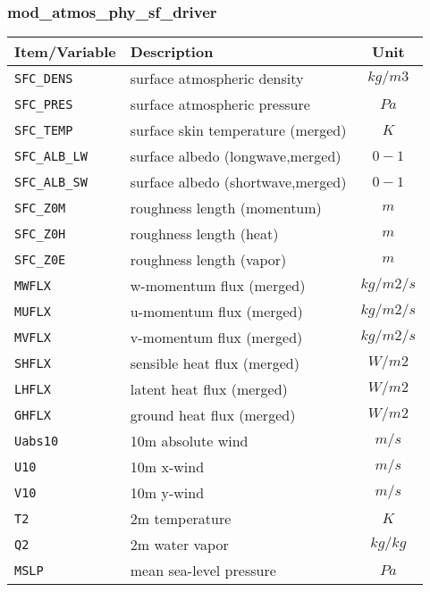 \subsubsection{mod\_atmos\_phy\_sf\_driver}
 \begin{tabularx}{150mm}{|l|X|c|} \hline
 \rowcolor[gray]{0.9} Item/Variable & Description  & Unit \\ \hline
  \verb|SFC_DENS| & surface atmospheric density & $kg/m3$ \\\hline
  \verb|SFC_PRES| & surface atmospheric pressure & $Pa$ \\\hline
  \verb|SFC_TEMP| & surface skin temperature (merged) & $K$ \\\hline
  \verb|SFC_ALB_LW| & surface albedo (longwave,merged) & $0-1$ \\\hline
  \verb|SFC_ALB_SW| & surface albedo (shortwave,merged) & $0-1$ \\\hline
  \verb|SFC_Z0M| & roughness length (momentum) & $m$ \\\hline
  \verb|SFC_Z0H| & roughness length (heat) & $m$ \\\hline
  \verb|SFC_Z0E| & roughness length (vapor) & $m$ \\\hline
  \verb|MWFLX| & w-momentum flux (merged) & $kg/m2/s$ \\\hline
  \verb|MUFLX| & u-momentum flux (merged) & $kg/m2/s$ \\\hline
  \verb|MVFLX| & v-momentum flux (merged) & $kg/m2/s$ \\\hline
  \verb|SHFLX| & sensible heat flux (merged) & $W/m2$ \\\hline
  \verb|LHFLX| & latent heat flux (merged) & $W/m2$ \\\hline
  \verb|GHFLX| & ground heat flux (merged) & $W/m2$ \\\hline
  \verb|Uabs10| & 10m absolute wind & $m/s$ \\\hline
  \verb|U10| & 10m x-wind & $m/s$ \\\hline
  \verb|V10| & 10m y-wind & $m/s$ \\\hline
  \verb|T2 | & 2m temperature & $K$ \\\hline
  \verb|Q2 | & 2m water vapor & $kg/kg$ \\\hline
  \verb|MSLP| & mean sea-level pressure & $Pa$ \\\hline
 \end{tabularx}


